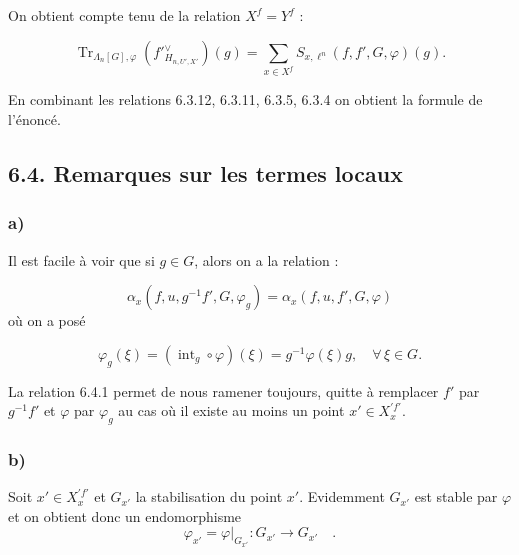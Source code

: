 \documentclass[11pt]{article}
\providecommand{\Tr}{\operatorname{Tr}}
\providecommand{\Tr}{\operatorname{Tr}}
\providecommand{\Tr}{\operatorname{Tr}}
\providecommand{\Tr}{\operatorname{Tr}}
\providecommand{\La}{\Lambda}
\providecommand{\Tr}{\operatorname{Tr}}
\begin{document}
On obtient compte tenu de la relation $X^f=Y^f$ :

\begin{equation}\tag{6.3.12}
\Tr_{\La_n[G],\varphi}(f'{}^\vee_{H_{n,U',X'}})(g)=\sum_{x\in X^f}S_{x,\ell^n}(f,f',G,\varphi)(g).
\end{equation}

En combinant les relations 6.3.12, 6.3.11, 6.3.5, 6.3.4 on obtient la formule de l'énoncé.

\subsection*{6.4. Remarques sur les termes locaux}
\subsubsection*{a)} Il est facile à voir que si $g\in G$, alors on a la relation :

\begin{equation}\tag{6.4.1}
\alpha_x(f,u,g^{-1}f',G,\varphi_g)=\alpha_x(f,u,f',G,\varphi)
\end{equation}
où on a posé

\begin{equation}\tag{6.4.2}
\varphi_g(\xi)=(\operatorname{int}_g\circ\varphi)(\xi)=g^{-1}\varphi(\xi)g,
\quad \forall\,\xi\in G.
\end{equation}

La relation 6.4.1 permet de nous ramener toujours, quitte à remplacer $f'$ par $g^{-1}f'$ et $\varphi$ par $\varphi_g$ au cas où il existe au moins un point $x'\in X_x^{\prime f'}$.

\subsubsection*{b)} Soit $x'\in X_x^{\prime f'}$ et $G_{x'}$ la stabilisation du point $x'$. Evidemment $G_{x'}$ est stable par $\varphi$ et on obtient donc un endomorphisme%
\[
\varphi_{x'} = \varphi|_{G_{x'}} : G_{x'} \longrightarrow G_{x'} \quad .
\]
\end{document}
